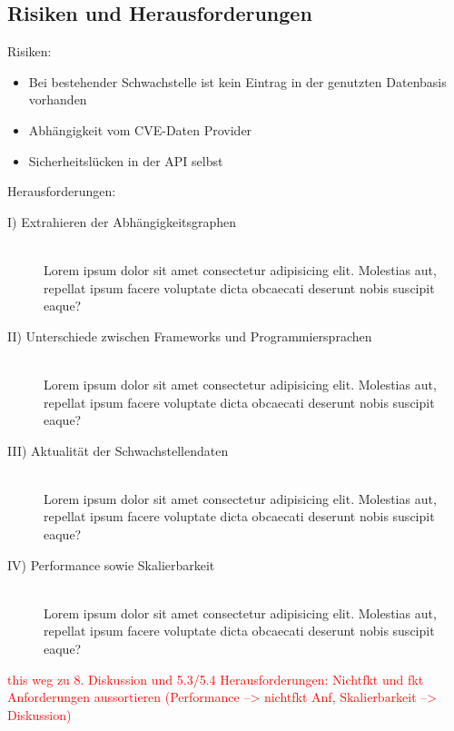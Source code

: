 \subsection{Risiken und Herausforderungen} \label{sec:Risiken und Herausforderungen}
    Risiken:
    \begin{itemize}
        \item Bei bestehender Schwachstelle ist kein Eintrag in der genutzten Datenbasis vorhanden
        \item Abhängigkeit vom CVE-Daten Provider
        \item Sicherheitslücken in der API selbst
    \end{itemize}
    Herausforderungen:
    \begin{description}
        \item[I) Extrahieren der Abhängigkeitsgraphen]\hfill \\
            Lorem ipsum dolor sit amet consectetur adipisicing elit. Molestias aut, repellat ipsum facere voluptate dicta obcaecati deserunt nobis suscipit eaque?
        \item[II) Unterschiede zwischen Frameworks und Programmiersprachen]\hfill \\
            Lorem ipsum dolor sit amet consectetur adipisicing elit. Molestias aut, repellat ipsum facere voluptate dicta obcaecati deserunt nobis suscipit eaque?
        \item[III) Aktualität der Schwachstellendaten]\hfill \\
            Lorem ipsum dolor sit amet consectetur adipisicing elit. Molestias aut, repellat ipsum facere voluptate dicta obcaecati deserunt nobis suscipit eaque?
        \item[IV) Performance sowie Skalierbarkeit]\hfill \\
            Lorem ipsum dolor sit amet consectetur adipisicing elit. Molestias aut, repellat ipsum facere voluptate dicta obcaecati deserunt nobis suscipit eaque?
    \end{description}

    \textcolor{red}{
        this weg zu 8. Diskussion und 5.3/5.4 Herausforderungen: Nichtfkt und fkt Anforderungen aussortieren (Performance --> nichtfkt Anf, Skalierbarkeit --> Diskussion)
    }
